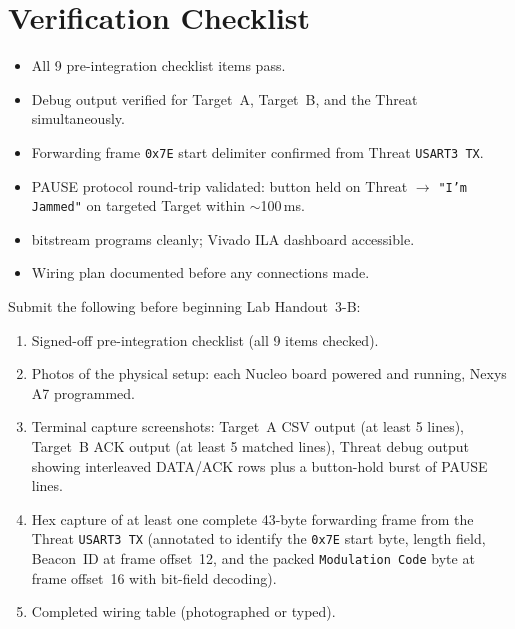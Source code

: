 \documentclass[11pt,letterpaper]{article}
\begin{document}
\section{Verification Checklist}
\begin{itemize}[leftmargin=2em]
	\item[$\square$] All 9 pre-integration checklist items pass.
	\item[$\square$] Debug \UART{} output verified for Target~A, Target~B, and the Threat simultaneously.
	\item[$\square$] Forwarding frame \texttt{0x7E} start delimiter confirmed from Threat \texttt{USART3 TX}.
	\item[$\square$] PAUSE protocol round-trip validated: button held on Threat $\to$ \texttt{"I'm Jammed"} on targeted Target within $\sim$100\,ms.
	\item[$\square$] \FPGA{} bitstream programs cleanly; Vivado \mbox{ILA} dashboard accessible.
	\item[$\square$] Wiring plan documented before any connections made.
\end{itemize}

\begin{tcolorbox}[deliverable={Lab Handout 3-A Deliverable}]
	Submit the following before beginning Lab Handout~3-B:
	\begin{enumerate}[leftmargin=1.2em]
		\item Signed-off pre-integration checklist (all 9 items checked).
		\item Photos of the physical setup: each Nucleo board powered and running, Nexys A7 programmed.
		\item Terminal capture screenshots: Target~A CSV output (at least 5 lines), Target~B ACK output (at least 5 matched lines), Threat debug output showing interleaved DATA/ACK rows plus a button-hold burst of PAUSE lines.
		\item Hex capture of at least one complete 43-byte forwarding frame from the Threat \texttt{USART3 TX} (annotated to identify the \texttt{0x7E} start byte, length field, Beacon~ID at frame offset~12, and the packed \texttt{Modulation Code} byte at frame offset~16 with bit-field decoding).
		\item Completed wiring table (photographed or typed).
	\end{enumerate}
\end{tcolorbox}

\printhandoutglossary
\end{document}
